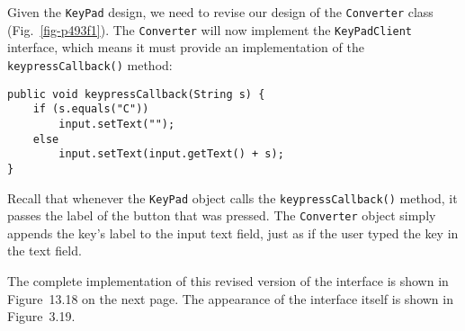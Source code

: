 Given the {\tt KeyPad} design, we need to revise
our design of the {\tt Converter} class (Fig.~\ref{fig-p493f1}).
The {\tt Converter} will now implement the {\tt KeyPad\-Client}
interface, which means it must provide an implementation of the
{\tt keypressCall\-back()} method:

\begin{jjjlisting}
\begin{lstlisting}
public void keypressCallback(String s) {
    if (s.equals("C"))
        input.setText("");
    else
        input.setText(input.getText() + s);
}
\end{lstlisting}
\end{jjjlisting}

\noindent Recall that whenever the {\tt KeyPad} object calls the 
{\tt keypressCallback()} method, it passes the label of the button that
was pressed. The {\tt Converter} object simply appends the key's label
to the input text field, just as if the user typed the key in the
text field.

The complete implementation of this revised version of the interface
is shown in Figure~13.18 on the next page. The appearance of the
interface itself is shown in Figure~3.19.


